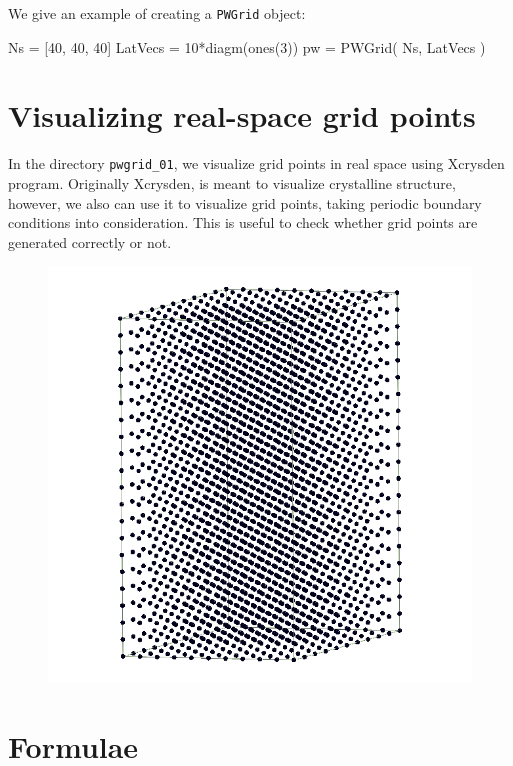 \documentclass[a4paper,11pt]{extarticle}
\begin{document}
We give an example of creating a {\tt PWGrid} object:
\begin{juliacode}
Ns = [40, 40, 40]
LatVecs = 10*diagm(ones(3))
pw = PWGrid( Ns, LatVecs )
\end{juliacode}


\section{Visualizing real-space grid points}

In the directory \verb|pwgrid_01|, we visualize grid points in real space
using Xcrysden program. Originally Xcrysden, is meant to visualize crystalline structure,
however, we also can use it to visualize grid points, taking periodic boundary
conditions into consideration.
This is useful to check whether grid points are generated correctly or not.

\begin{figure}
\centering
\includegraphics[scale=0.25]{images/R_grid_hexagonal.png}
\par
\end{figure}



\section{Formulae}
\end{document}
